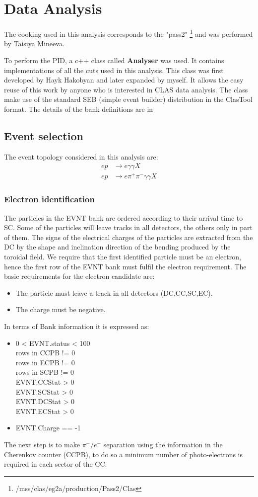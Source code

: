 \chapter{Data Analysis}
\label{ch:data_ana}
The cooking used in this analysis corresponds to the "pass2" \footnote{/mss/clas/eg2a/production/Pass2/Clas} and was performed by Taisiya Mineeva.

To perform the PID, a c++ class called \textbf{Analyser} was used. It contains implementations of all the cuts used in this analysis. This class was first developed by Hayk Hakobyan and later expanded by myself. It allows the easy reuse of this work by anyone who is interested in CLAS data analysis. The class make use of the standard SEB (simple event builder) distribution in the ClasTool format. The details of the bank definitions are in \cite{CLAS_BANKS}
%
\clearpage
\section{Event selection}
The event topology considered in this analysis are:
\begin{align}
ep&\rightarrow e\gamma\gamma X \\
ep&\rightarrow e\pi^+\pi^-\gamma\gamma X
\end{align}
\subsection{Electron identification}
\label{s:e_id}
The particles in the EVNT bank are ordered according to their arrival time to SC. Some of the particles will leave tracks in all detectors, the others only in part of them. The signs of the  electrical charges of the particles are extracted from the DC by the shape and inclination direction of the bending produced by the toroidal field.
We require that the first identified particle must be an electron, hence the first row of the EVNT bank must fulfil the electron requirement. The basic requirements for the electron candidate are:
\begin{itemize}
\item The particle must leave a track in all detectors (DC,CC,SC,EC).
\item The charge must be negative.
\end{itemize}
In terms of Bank information it is expressed as:
\begin{itemize}
\item 0 < EVNT.status < 100 \\
	rows in CCPB != 0\\
	rows in ECPB != 0\\
	rows in SCPB != 0\\
	EVNT.CCStat > 0 \\
	EVNT.SCStat > 0 \\
	EVNT.DCStat > 0 \\
	EVNT.ECStat > 0
\item EVNT.Charge == -1
\end{itemize}
The next step is to make $\pi^-/e^-$ separation using the information in the Cherenkov counter (CCPB), to do so a minimum number of photo-electrons is required in each sector of the CC.

